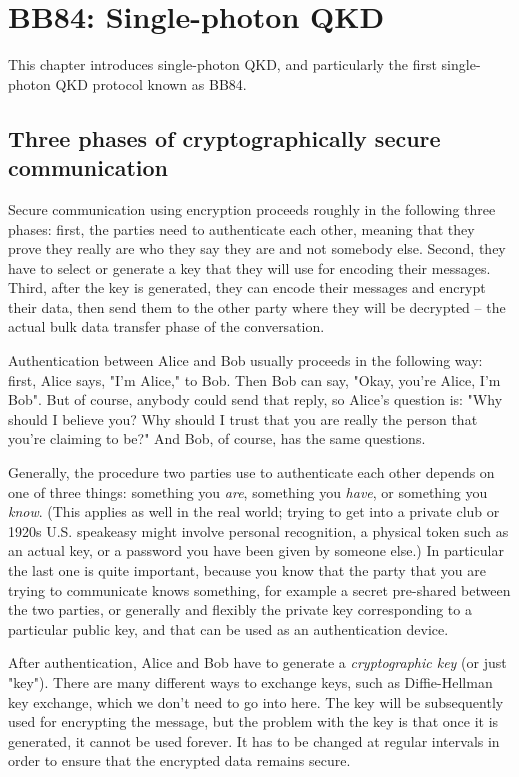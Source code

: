 \chapter{BB84: Single-photon QKD}

This chapter introduces single-photon QKD, and particularly the first single-photon QKD protocol known as BB84.

\section{Three phases of cryptographically secure communication}


Secure communication using encryption proceeds roughly in the following three phases: first, the parties need to authenticate each other, meaning that they prove they really are who they say they are and not somebody else. Second, they have to select or generate a key that they will use for encoding their messages.  Third, after the key is generated, they can encode their messages and encrypt their data, then send them to the other party where they will be decrypted -- the actual bulk data transfer phase of the conversation.

Authentication between Alice and Bob usually proceeds in the following way: first, Alice says, "I'm Alice," to Bob. Then Bob can say, "Okay, you're Alice, I'm Bob". But of course, anybody could send that reply, so Alice's question is: "Why should I believe you? Why should I trust that you are really the person that you're claiming to be?" And Bob, of course, has the same questions.

Generally, the procedure two parties use to authenticate each other depends on one of three things: something you \emph{are}, something you \emph{have}, or something you \emph{know}. (This applies as well in the real world; trying to get into a private club or 1920s U.S. speakeasy might involve personal recognition, a physical token such as an actual key, or a password you have been given by someone else.)  In particular the last one is quite important, because you know that the party that you are trying to communicate knows something, for example a secret pre-shared between the two parties, or generally and flexibly the private key corresponding to a particular public key, and that can be used as an authentication device.

After authentication, Alice and Bob have to generate a \emph{cryptographic key} (or just "key"). There are many different ways to exchange keys, such as Diffie-Hellman key exchange, which we don't need to go into here. The key will be subsequently used for encrypting the message, but the problem with the key is that once it is generated, it cannot be used forever. It has to be changed at regular intervals in order to ensure that the encrypted data remains secure.

